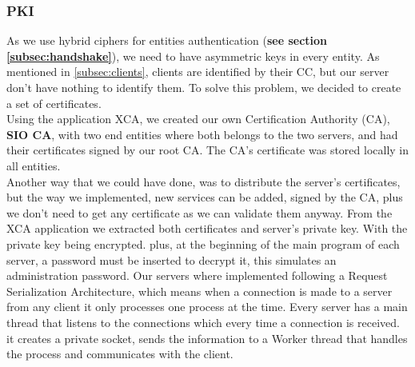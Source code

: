 \documentclass[12pt]{article}
\begin{document}
\subsubsection{PKI}
As we use hybrid ciphers for entities authentication (\textbf{see section \ref{subsec:handshake}}),
  we need to have asymmetric keys in every entity. As mentioned in \ref{subsec:clients}, clients are
  identified by their CC, but our server don't have nothing to identify them. To solve this problem, we decided to 
  create a set of certificates. \\
Using the application XCA, we created our own Certification Authority (CA), \textbf{SIO CA}, with two
  end entities where both belongs to the two servers, and had their certificates signed
  by our root CA. The CA's certificate was stored locally in all entities. \\
Another way that we could have done, was to distribute the server's certificates, but the
  way we implemented, new services can be added, signed by the CA, plus we don't need to
  get any certificate as we can validate them anyway.
From the XCA application we extracted both certificates and server's private key.
  With the private key being encrypted. plus, at the beginning of the main program of each server, a password
  must be inserted to decrypt it, this simulates an administration password.
Our servers where implemented following a Request Serialization Architecture, which means
  when a connection is made to a server from any client it only processes one process at the time. 
  Every server has a main thread that listens to the connections which every time a connection is received. it
  creates a private socket, sends the information to a Worker thread that handles the process and
  communicates with the client.
\end{document}
